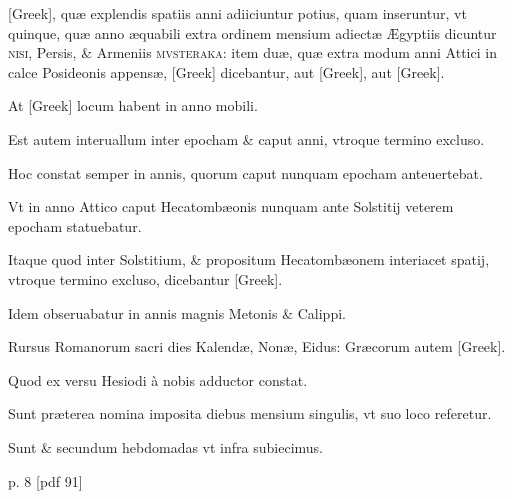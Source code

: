 \begin{parnumbers}
\textgreek{[Greek]}, quæ explendis spatiis anni adiiciuntur potius,
quam inseruntur, vt quinque, quæ anno æquabili extra ordinem mensium
adiectæ Ægyptiis dicuntur \textsc{nisi}, Persis, \& Armeniis \textsc{mvsteraka}: 
item duæ, quæ extra modum anni Attici in calce Posideonis 
appensæ, \textgreek{[Greek]} dicebantur,
 aut \textgreek{[Greek]}, aut \textgreek{[Greek]}.

At \textgreek{[Greek]} locum habent in anno mobili.

Est autem interuallum
inter epocham \& caput anni, vtroque termino excluso.

Hoc
constat semper in annis, quorum caput nunquam epocham anteuertebat.

Vt in anno Attico caput Hecatombæonis nunquam ante Solstitij
veterem epocham statuebatur.

Itaque quod inter Solstitium, \&
propositum Hecatombæonem interiacet spatij, vtroque termino excluso,
dicebantur \textgreek{[Greek]}.

Idem obseruabatur in annis magnis
Metonis \& Calippi.

Rursus Romanorum sacri dies Kalendæ, Nonæ,
Eidus: Græcorum autem \textgreek{[Greek]}.

Quod ex versu Hesiodi à
nobis adductor constat.

Sunt præterea nomina imposita diebus mensium 
singulis, vt suo loco referetur.

Sunt \& secundum hebdomadas
vt infra subiecimus.
\end{parnumbers}
\clearpage
p. 8 [pdf 91]

